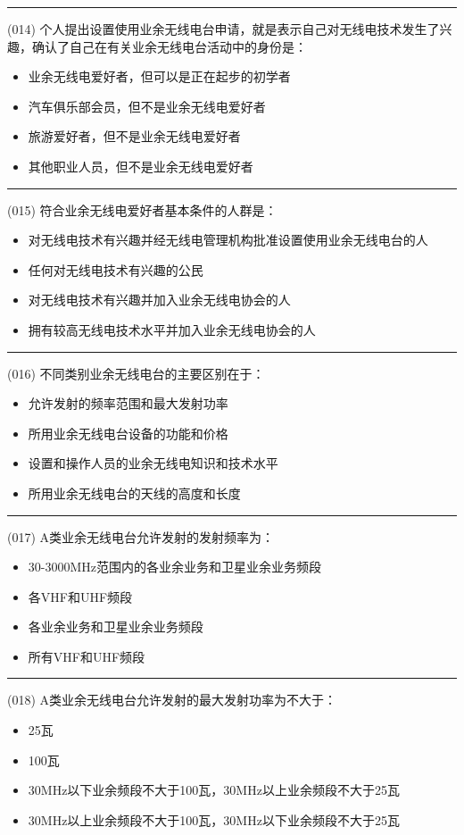 \documentclass[twocolumn]{ctexart}  %
\begin{document}
\noindent\rule{0.5\textwidth}{1pt}
\heiti (014) 个人提出设置使用业余无线电台申请，就是表示自己对无线电技术发生了兴趣，确认了自己在有关业余无线电台活动中的身份是： \songti {\color{gray} [LK0052] }
\begin{itemize}
	\item  业余无线电爱好者，但可以是正在起步的初学者
	\item  汽车俱乐部会员，但不是业余无线电爱好者
	\item  旅游爱好者，但不是业余无线电爱好者
	\item  其他职业人员，但不是业余无线电爱好者
\end{itemize}


\noindent\rule{0.5\textwidth}{1pt}
\heiti (015) 符合业余无线电爱好者基本条件的人群是： \songti {\color{gray} [LK0112] }
\begin{itemize}
	\item  对无线电技术有兴趣并经无线电管理机构批准设置使用业余无线电台的人
	\item  任何对无线电技术有兴趣的公民
	\item  对无线电技术有兴趣并加入业余无线电协会的人
	\item  拥有较高无线电技术水平并加入业余无线电协会的人
\end{itemize}


\noindent\rule{0.5\textwidth}{1pt}
\heiti (016) 不同类别业余无线电台的主要区别在于： \songti {\color{gray} [LK0013] }
\begin{itemize}
	\item  允许发射的频率范围和最大发射功率
	\item  所用业余无线电台设备的功能和价格
	\item  设置和操作人员的业余无线电知识和技术水平
	\item  所用业余无线电台的天线的高度和长度
\end{itemize}


\noindent\rule{0.5\textwidth}{1pt}
\heiti (017) A类业余无线电台允许发射的发射频率为： \songti {\color{gray} [LK0014] }
\begin{itemize}
	\item  30-3000MHz范围内的各业余业务和卫星业余业务频段
	\item  各VHF和UHF频段
	\item  各业余业务和卫星业余业务频段
	\item  所有VHF和UHF频段
\end{itemize}


\noindent\rule{0.5\textwidth}{1pt}
\heiti (018) A类业余无线电台允许发射的最大发射功率为不大于： \songti {\color{gray} [LK0017] }
\begin{itemize}
	\item  25瓦
	\item  100瓦
	\item  30MHz以下业余频段不大于100瓦，30MHz以上业余频段不大于25瓦
	\item  30MHz以上业余频段不大于100瓦，30MHz以下业余频段不大于25瓦
\end{itemize}
\end{document}
